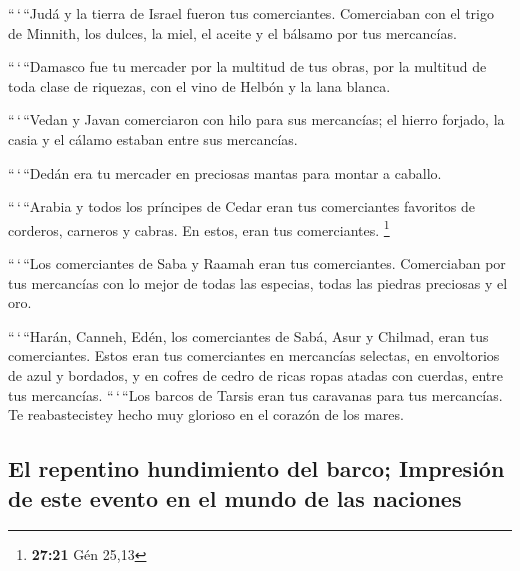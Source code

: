 \begin{paracol}{2}
 ``\,`\,``Judá y la tierra de Israel fueron tus
comerciantes. Comerciaban con el trigo de Minnith, los dulces, la miel,
el aceite y el bálsamo por tus mercancías.

 ``\,`\,``Damasco fue tu mercader por la multitud de tus
obras, por la multitud de toda clase de riquezas, con el vino de Helbón
y la lana blanca.

 ``\,`\,``Vedan y Javan comerciaron con hilo para sus
mercancías; el hierro forjado, la casia y el cálamo estaban entre sus
mercancías.

 ``\,`\,``Dedán era tu mercader en preciosas mantas para
montar a caballo.

 ``\,`\,``Arabia y todos los príncipes de Cedar eran tus
comerciantes favoritos de corderos, carneros y cabras. En estos, eran
tus comerciantes. \footnote{\textbf{27:21} Gén 25,13}

 ``\,`\,``Los comerciantes de Saba y Raamah eran tus
comerciantes. Comerciaban por tus mercancías con lo mejor de todas las
especias, todas las piedras preciosas y el oro.

 ``\,`\,``Harán, Canneh, Edén, los comerciantes de Sabá,
Asur y Chilmad, eran tus comerciantes.  Estos eran tus
comerciantes en mercancías selectas, en envoltorios de azul y bordados,
y en cofres de cedro de ricas ropas atadas con cuerdas, entre tus
mercancías.  ``\,`\,``Los barcos de Tarsis eran tus
caravanas para tus mercancías. Te reabastecistey hecho muy glorioso en
el corazón de los mares.

\hypertarget{el-repentino-hundimiento-del-barco-impresiuxf3n-de-este-evento-en-el-mundo-de-las-naciones}{%
\subsection{El repentino hundimiento del barco; Impresión de este evento
en el mundo de las
naciones}\label{el-repentino-hundimiento-del-barco-impresiuxf3n-de-este-evento-en-el-mundo-de-las-naciones}}


\end{paracol}

